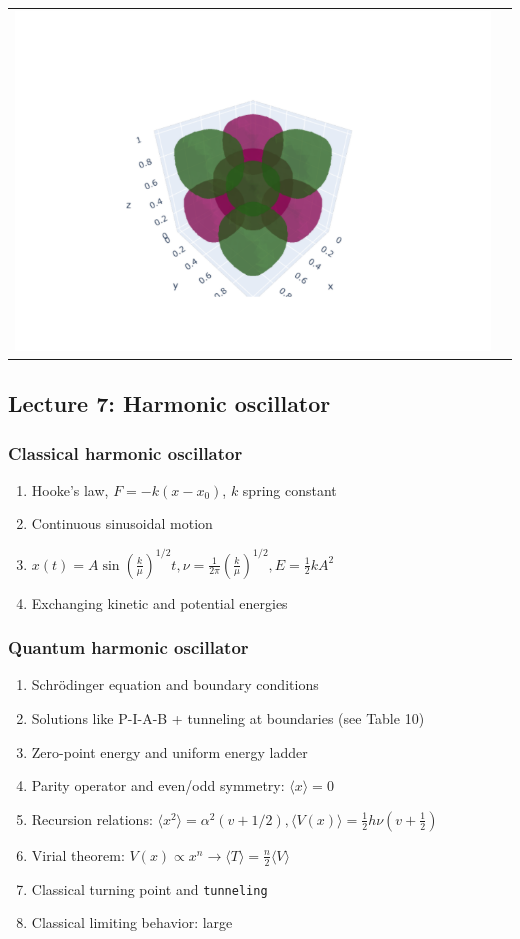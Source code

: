 \documentclass[11pt]{article}
\begin{document}
\begin{table}
\begin{tabular}{cc}
\includegraphics[scale=0.5]{./Images/psi_f.png} \\
\end{tabular}
\end{table}

\subsection{Lecture 7: Harmonic oscillator}
\label{sec:org6449a92}
\subsubsection{Classical harmonic oscillator}
\label{sec:org1f21042}
\begin{enumerate}
\item Hooke's law, \(F=-k(x-x_0)\), \(k\) spring constant
\item Continuous sinusoidal motion
\item \(x(t)=A \sin(\frac{k}{\mu})^{1/2}t, \nu=\frac{1}{2\pi}(\frac{k}{\mu})^{1/2}, E=\frac{1}{2}kA^2\)
\item Exchanging kinetic and potential energies
\end{enumerate}
\subsubsection{Quantum harmonic oscillator}
\label{sec:org550e5b8}
\begin{enumerate}
\item Schr\"{o}dinger equation and boundary conditions
\item Solutions like P-I-A-B + tunneling at boundaries (see Table 10)
\item Zero-point energy and uniform energy ladder
\item Parity operator and even/odd symmetry:  \(\langle x \rangle =0\)
\item Recursion relations: \(\langle x^2 \rangle =
      \alpha^2 (v+1/2), \langle V(x) \rangle = \frac{1}{2} h\nu (v+\frac{1}{2})\)
\item Virial theorem: \(V(x) \propto x^n \rightarrow \langle T \rangle = \frac{n}{2}\langle V \rangle\)
\item Classical turning point and \texttt{tunneling}
\item Classical limiting behavior: large
\end{enumerate}
\end{document}

